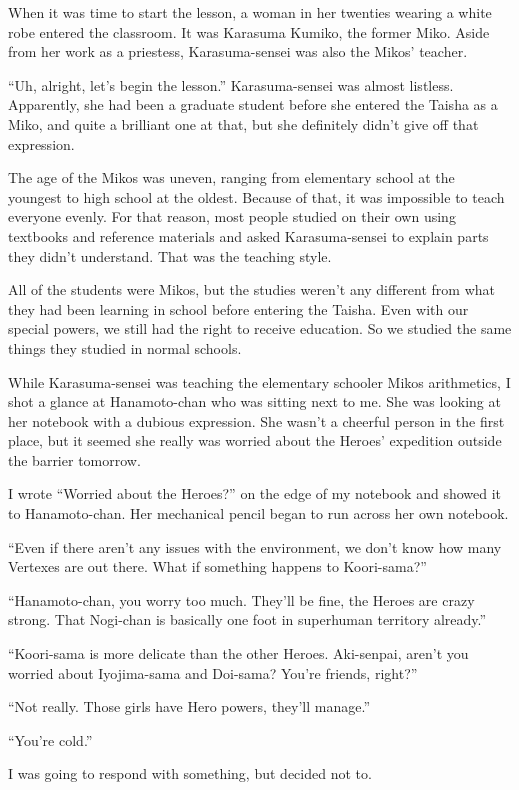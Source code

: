 When it was time to start the lesson, a woman in her twenties wearing a white robe entered the classroom. It was Karasuma Kumiko, the former Miko. Aside from her work as a priestess, Karasuma-sensei was also the Mikos' teacher.

``Uh, alright, let's begin the lesson.''  Karasuma-sensei was almost listless. Apparently, she had been a graduate student before she entered the Taisha as a Miko, and quite a brilliant one at that, but she definitely didn't give off that expression.

The age of the Mikos was uneven, ranging from elementary school at the youngest to high school at the oldest. Because of that, it was impossible to teach everyone evenly. For that reason, most people studied on their own using textbooks and reference materials and asked Karasuma-sensei to explain parts they didn't understand. That was the teaching style.

All of the students were Mikos, but the studies weren't any different from what they had been learning in school before entering the Taisha. Even with our special powers, we still had the right to receive education. So we studied the same things they studied in normal schools.

While Karasuma-sensei was teaching the elementary schooler Mikos arithmetics, I shot a glance at Hanamoto-chan who was sitting next to me. She was looking at her notebook with a dubious expression. She wasn't a cheerful person in the first place, but it seemed she really was worried about the Heroes' expedition outside the barrier tomorrow.

I wrote ``Worried about the Heroes?'' on the edge of my notebook and showed it to Hanamoto-chan. Her mechanical pencil began to run across her own notebook.

``Even if there aren't any issues with the environment, we don't know how many Vertexes are out there. What if something happens to Koori-sama?''

``Hanamoto-chan, you worry too much. They'll be fine, the Heroes are crazy strong. That Nogi-chan is basically one foot in superhuman territory already.''

``Koori-sama is more delicate than the other Heroes. Aki-senpai, aren't you worried about Iyojima-sama and Doi-sama? You're friends, right?''

``Not really. Those girls have Hero powers, they'll manage.''

``You're cold.''

I was going to respond with something, but decided not to.


